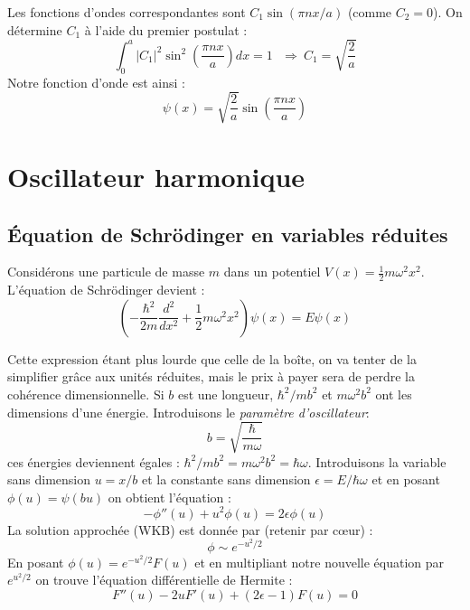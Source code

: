 \documentclass[british,french,11pt, a4paper, openany]{book}
\begin{document}
	Les fonctions d'ondes correspondantes sont $C_1\sin(\pi n x/a)$ (comme $C_2 = 0$). On détermine $C_1$ à l'aide du premier postulat :
	\begin{equation}
		\int_0^a |C_1|^2\sin^2\left(\frac{\pi n x}{a}\right)dx = 1\ \ \ \Rightarrow\ C_1 = \sqrt{\frac{2}{a}}
	\end{equation}
	Notre fonction d'onde est ainsi :
	\begin{equation}
		\psi(x) = \sqrt{\frac{2}{a}}\sin\left(\frac{\pi n x}{a}\right)
	\end{equation}
	
	
	\section{Oscillateur harmonique}
	\subsection{Équation de Schrödinger en variables réduites}
	Considérons une particule de masse $m$ dans un potentiel $V(x) = \frac{1}{2}m\omega^2x^2$. L'équation de Schrödinger devient :
	\begin{equation}
		\left(-\frac{\hbar^2}{2m}\frac{d^2}{dx^2} + \frac{1}{2}m\omega^2x^2\right)\psi(x) = E\psi(x)
	\end{equation}
	
	Cette expression étant plus lourde que celle de la boîte, on va tenter de la simplifier grâce aux unités réduites, mais le prix à payer sera de perdre la cohérence dimensionnelle. Si $b$ est une longueur, $\hbar^2/mb^2$ et $m\omega^2b^2$ ont les dimensions d'une énergie.  Introduisons le \textit{paramètre d'oscillateur}:
	\begin{equation}
		b = \sqrt{\dfrac{\hbar}{m\omega}}
	\end{equation}
	ces énergies deviennent égales : $\hbar^2/mb^2 = m\omega^2b^2 = \hbar\omega$. Introduisons la variable sans dimension $u = x/b$ et la constante sans dimension $\epsilon = E/\hbar\omega$ et en posant $\phi(u) = \psi(bu)$ on obtient l'équation :
	\begin{equation}
		-\phi''(u) + u^2\phi(u) = 2\epsilon\phi(u)
	\end{equation}
	La solution approchée (WKB) est donnée par (retenir par cœur) :
	\begin{equation}
		\phi \sim e^{-u^2/2}
	\end{equation}
	En posant $\phi(u) = e^{-u^2/2}F(u)$ et en multipliant notre nouvelle équation par $e^{u^2/2}$ on trouve l'équation différentielle de Hermite :
	\begin{equation}
		F''(u) - 2uF'(u) + (2\epsilon - 1)F(u) = 0
	\end{equation}
	
\end{document}
